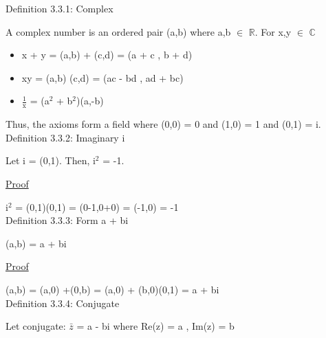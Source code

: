 { \color{blue} Definition 3.3.1: Complex } 
	
	\qquad A complex number is an ordered pair (a,b) where a,b $\in$ $ \mathbb{R} $.
	For x,y $\in$ $\mathbb{C}$
	\begin{itemize}[leftmargin=2cm]
		\item x + y = (a,b) + (c,d) = (a + c , b + d)
		\item xy = (a,b) (c,d) = (ac - bd , ad + bc)
		\item $\frac{1}{\text{x}}$  = (a$^2$ + b$^2$)(a,-b)
	\end{itemize}

	Thus, the axioms form a field where (0,0) = 0 and (1,0) = 1 and (0,1) = i. \\

{ \color{blue} Definition 3.3.2: Imaginary i } 
	
	\qquad Let i = (0,1). Then, i$^2$ = -1.

{ \color{magenta} \underline{Proof} } 
	
	i$^\text{2}$ = (0,1)(0,1) = (0-1,0+0) = (-1,0) = -1 \\

{ \color{blue} Definition 3.3.3: Form a + bi } 
	
	\qquad (a,b) = a + bi

{ \color{magenta} \underline{Proof} } 
	
	(a,b) = (a,0) +(0,b) = (a,0) + (b,0)(0,1) = a + bi \\

{ \color{blue} Definition 3.3.4: Conjugate }
	
	\qquad Let conjugate: $\bar{z}$ = a - bi where Re(z) = a , Im(z) = b \\


